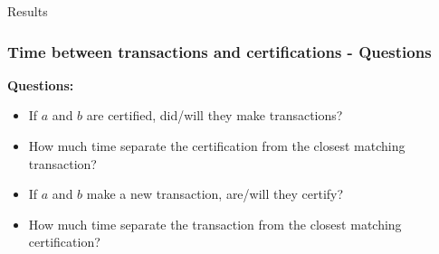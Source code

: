 \documentclass{beamer}
\begin{document}
\begin{frame}
	\Huge{\centerline{Results}}
\end{frame}


\begin{frame}
	\frametitle{Time between transactions and certifications - \textbf{Questions}}
	{\Large \textbf{Questions:}}
	\bigskip
	\begin{itemize}
		\item<1-> If $a$ and $b$ are certified, did/will they make transactions? 
		\medskip
		\item<2-> How much time separate the certification from the closest matching transaction?
		\medskip
		\item<3-> If $a$ and $b$ make a new transaction, are/will they certify?
		\medskip
		\item<4-> How much time separate the transaction from the closest matching certification?
	\end{itemize}
\end{frame}


\end{document}

